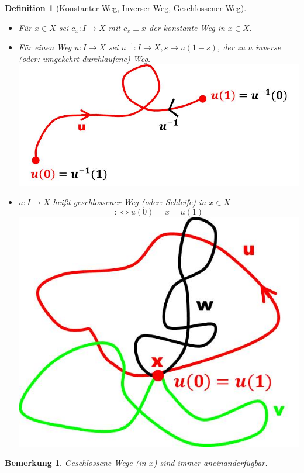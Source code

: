 \documentclass[a4paper,11pt,notitlepage]{report}
\newtheorem{definition}{Definition}[chapter]
\newtheorem{remark}{Bemerkung}[chapter]
\begin{document}
\begin{definition}[Konstanter Weg, Inverser Weg, Geschlossener Weg]
	\begin{itemize}
		\item Für $x \in X$ sei $c_x \colon I \rightarrow X$ mit $c_x \equiv x$ \underline{der konstante Weg in $x \in X$}.
		\item Für einen Weg $u \colon I \rightarrow X$ sei $u^{-1} \colon I \rightarrow X, s \mapsto u(1-s)$, der zu $u$ \underline{inverse} (oder: \underline{umgekehrt durchlaufene}) \underline{Weg}. \includegraphics[scale=0.4]{images/inverser_Weg.jpg}
		\item $u \colon I \rightarrow X$ heißt \underline{geschlossener Weg} (oder: \underline{Schleife}) \underline{in $x \in X$} 
		$$:\Leftrightarrow u(0) = x = u(1)$$ \includegraphics[scale=0.4]{images/Schleifen.jpg}
	\end{itemize}
\end{definition}

\begin{remark}{}
	Geschlossene Wege (in $x$) sind \underline{immer} aneinanderfügbar.
\end{remark}
\end{document}
